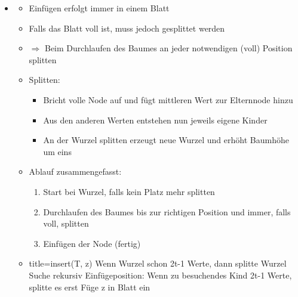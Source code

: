 \documentclass[
    12pt,
    a4paper,
    ngerman,
    color=3b,%
    marginpar=false,
    colorback=false,
    leqno,
]{tudaexercise}
\begin{document}
\begin{itemize}
        \item {}
            \begin{itemize}
                \item Einfügen erfolgt immer in einem Blatt
                \item Falls das Blatt voll ist, muss jedoch gesplittet werden
                \item $\Rightarrow$ Beim Durchlaufen des Baumes an jeder notwendigen (voll) Position splitten
                \item Splitten:
                    \begin{itemize}
                        \item Bricht volle Node auf und fügt mittleren Wert zur Elternnode hinzu
                        \item Aus den anderen Werten entstehen nun jeweils eigene Kinder
                        \item An der Wurzel splitten erzeugt neue Wurzel und erhöht Baumhöhe um eins
                    \end{itemize}
                \item Ablauf zusammengefasst:
                    \begin{enumerate}
                        \item Start bei Wurzel, falls kein Platz mehr splitten
                        \item Durchlaufen des Baumes bis zur richtigen Position und immer, falls voll, splitten
                        \item Einfügen der Node (fertig)
                    \end{enumerate}
                \item[]
                    \begin{ccode}[autogobble]{title={insert(T, z)}}
                    Wenn Wurzel schon 2t-1 Werte, dann splitte Wurzel
                    Suche rekursiv Einfügeposition:
                        Wenn zu besuchendes Kind 2t-1 Werte, splitte es erst
                    Füge z in Blatt ein
                    \end{ccode}
            \end{itemize}


\end{itemize}
\end{document}
